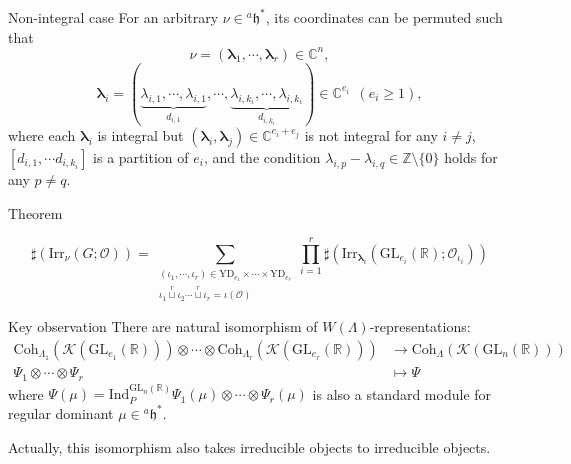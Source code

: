\documentclass[fleqn,xcolor=dvipsnames]{beamer}
\newcommand{\blam}{{\boldsymbol{\lambda}}}
\newcommand{\BC}{{\mathbb {C}}}
\newcommand{\BR}{{\mathbb {R}}}
\newcommand{\BZ}{{\mathbb {Z}}}
\newcommand{\CK}{{\mathcal {K}}}
\newcommand{\CO}{{\mathcal {O}}}
\newcommand{\fh}{\mathfrak{h}}
\newcommand{\GL}{{\mathrm{GL}}}
\newcommand{\Ind}{{\mathrm{Ind}}}
\newcommand{\Irr}{{\mathrm{Irr}}}
\begin{document}
\begin{frame}{Non-integral case}
  For an arbitrary $\nu \in {^{a}\fh}^*$, its coordinates can be permuted such that 
        \[
        \nu = (\blam_1, \cdots, \blam_r) \in \BC^n,
        \]
        \[
        \blam_i = (\underbrace{\lambda_{i,1}, \cdots, \lambda_{i,1}}_{d_{i,1}}, \cdots, \underbrace{\lambda_{i,k_i}, \cdots, \lambda_{i,k_i}}_{d_{i,k_i}}) \in \BC^{e_i} \ \ (e_i \geq 1),
        \]  
        where each $\blam_i$ is integral but $(\blam_i,\blam_j) \in \BC^{e_i+e_j}$ is not integral for any $i \neq j$, $[d_{i,1}, \cdots d_{i,k_i} ]$ is a partition of $e_i$, and the condition $\lambda_{i,p} - \lambda_{i,q} \in \BZ \setminus \{0\}$ holds for any $p \neq q$.
  \begin{block}{Theorem}
    
        \begin{equation*}
            \sharp(\Irr_{\nu}(G;\CO)) = \sum_{\substack{(\iota_1,\cdots,\iota_r) \in \mathrm{YD}_{e_1} \times \cdots \times \mathrm{YD}_{e_r} \\ \iota_1 \mathop{\sqcup}\limits^r \iota_2 \cdots \mathop{\sqcup}\limits^r  \iota_r = \iota(\CO) }}\prod_{i=1}^{r}\sharp(\Irr_{\blam_i}(\GL_{e_i}(\BR);\CO_{\iota_i}))
        \end{equation*}
  \end{block}
\end{frame}






\begin{frame}{Key observation}
  There are natural isomorphism of $W(\Lambda)$-representations:
  \begin{align*}
    \mathrm{Coh}_{\Lambda_1}(\CK(\GL_{e_1}(\BR))) \otimes \cdots \otimes \mathrm{Coh}_{\Lambda_r}(\CK(\GL_{e_r}(\BR))) &\to \mathrm{Coh}_{\Lambda}(\CK(\GL_{n}(\BR)))\\
    \Psi_1 \otimes \cdots \otimes \Psi_r & \mapsto \Psi
  \end{align*}
  where $\Psi(\mu) = \Ind_{P}^{\GL_{n}(\BR)}\Psi_1(\mu) \otimes \cdots \otimes \Psi_r(\mu)$ is also a standard module for regular dominant $\mu \in {^{a}\fh}^*$.\par
  Actually, this isomorphism also takes irreducible objects to irreducible objects.
\end{frame}
\end{document}
